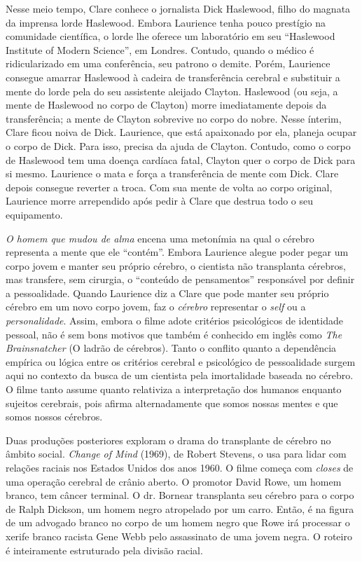 Nesse meio tempo, Clare conhece o jornalista Dick Haslewood, filho do
magnata da imprensa lorde Haslewood. Embora Laurience tenha pouco
prestígio na comunidade científica, o lorde lhe oferece um laboratório
em seu ``Haslewood Institute of Modern Science'', em Londres. Contudo,
quando o médico é ridicularizado em uma conferência, seu patrono o
demite. Porém, Laurience consegue amarrar Haslewood à cadeira de
transferência cerebral e substituir a mente do lorde pela do seu
assistente aleijado Clayton. Haslewood (ou seja, a mente de Haslewood no
corpo de Clayton) morre imediatamente depois da transferência; a mente
de Clayton sobrevive no corpo do nobre. Nesse ínterim, Clare ficou noiva
de Dick. Laurience, que está apaixonado por ela, planeja ocupar o corpo
de Dick. Para isso, precisa da ajuda de Clayton. Contudo, como o corpo
de Haslewood tem uma doença cardíaca fatal, Clayton quer o corpo de Dick
para si mesmo. Laurience o mata e força a transferência de mente com
Dick. Clare depois consegue reverter a troca. Com sua mente de volta ao
corpo original, Laurience morre arrependido após pedir à Clare que
destrua todo o seu equipamento.

\emph{O homem que mudou de alma} encena uma metonímia na qual o cérebro
representa a mente que ele ``contém''. Embora Laurience alegue poder
pegar um corpo jovem e manter seu próprio cérebro, o cientista não
transplanta cérebros, mas transfere, sem cirurgia, o ``conteúdo de
pensamentos'' responsável por definir a pessoalidade. Quando Laurience
diz a Clare que pode manter seu próprio cérebro em um novo corpo jovem,
faz o \emph{cérebro} representar o \emph{self} ou a
\emph{personalidade}. Assim, embora o filme adote critérios psicológicos
de identidade pessoal, não é sem bons motivos que também é conhecido em
inglês como \emph{The Brainsnatcher} (O ladrão de cérebros). Tanto o
conflito quanto a dependência empírica ou lógica entre os critérios
cerebral e psicológico de pessoalidade surgem aqui no contexto da busca
de um cientista pela imortalidade baseada no cérebro. O filme tanto
assume quanto relativiza a interpretação dos humanos enquanto sujeitos
cerebrais, pois afirma alternadamente que somos nossas mentes e que
somos nossos cérebros.

Duas produções posteriores exploram o drama do transplante de cérebro no
âmbito social. \emph{Change of Mind} (1969), de Robert Stevens, o usa
para lidar com relações raciais nos Estados Unidos dos anos 1960. O
filme começa com \emph{closes} de uma operação cerebral de crânio
aberto. O promotor David Rowe, um homem branco, tem câncer terminal. O
dr. Bornear transplanta seu cérebro para o corpo de Ralph Dickson, um
homem negro atropelado por um carro. Então, é na figura de um advogado
branco no corpo de um homem negro que Rowe irá processar o xerife branco
racista Gene Webb pelo assassinato de uma jovem negra. O roteiro é
inteiramente estruturado pela divisão racial.

